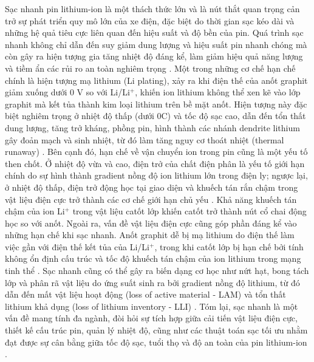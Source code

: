 \documentclass{thesis}
\begin{document}
Sạc nhanh pin lithium-ion là một thách thức lớn và là nút thắt quan trọng cản trở sự phát triển quy mô lớn của xe điện, đặc biệt do thời gian sạc kéo dài và những hệ quả tiêu cực liên quan đến hiệu suất và độ bền của pin. Quá trình sạc nhanh không chỉ dẫn đến suy giảm dung lượng và hiệu suất pin nhanh chóng mà còn gây ra hiện tượng gia tăng nhiệt độ đáng kể, làm giảm hiệu quả năng lượng và tiềm ẩn các rủi ro an toàn nghiêm trọng \cite{Xie2020, Zhang2020, Li2020}. Một trong những cơ chế hạn chế chính là hiện tượng mạ lithium (Li plating), xảy ra khi điện thế của anốt graphit giảm xuống dưới 0 V so với Li/Li$^+$, khiến ion lithium không thể xen kẽ vào lớp graphit mà kết tủa thành kim loại lithium trên bề mặt anốt. Hiện tượng này đặc biệt nghiêm trọng ở nhiệt độ thấp (dưới 0\textdegree C) và tốc độ sạc cao, dẫn đến tổn thất dung lượng, tăng trở kháng, phồng pin, hình thành các nhánh dendrite lithium gây đoản mạch và sinh nhiệt, từ đó làm tăng nguy cơ thoát nhiệt (thermal runaway) \cite{Zhang2020, Tomaszewska2019}. Bên cạnh đó, hạn chế về vận chuyển ion trong pin cũng là một yếu tố then chốt. Ở nhiệt độ vừa và cao, điện trở của chất điện phân là yếu tố giới hạn chính do sự hình thành gradient nồng độ ion lithium lớn trong điện ly; ngược lại, ở nhiệt độ thấp, điện trở động học tại giao diện và khuếch tán rắn chậm trong vật liệu điện cực trở thành các cơ chế giới hạn chủ yếu \cite{Hasan2015, Tomaszewska2019}. Khả năng khuếch tán chậm của ion Li$^+$ trong vật liệu catốt lớp khiến catốt trở thành nút cổ chai động học so với anốt. Ngoài ra, vấn đề vật liệu điện cực cũng góp phần đáng kể vào những hạn chế khi sạc nhanh. Anốt graphit dễ bị mạ lithium do điện thế làm việc gần với điện thế kết tủa của Li/Li$^+$, trong khi catốt lớp bị hạn chế bởi tính không ổn định cấu trúc và tốc độ khuếch tán chậm của ion lithium trong mạng tinh thể \cite{Xie2020, Li2020}. Sạc nhanh cũng có thể gây ra biến dạng cơ học như nứt hạt, bong tách lớp và phân rã vật liệu do ứng suất sinh ra bởi gradient nồng độ lithium, từ đó dẫn đến mất vật liệu hoạt động (loss of active material - LAM) và tổn thất lithium khả dụng (loss of lithium inventory - LLI) \cite{Tomaszewska2019, Zhang2016}. Tóm lại, sạc nhanh là một vấn đề mang tính đa ngành, đòi hỏi sự tích hợp giữa cải tiến vật liệu điện cực, thiết kế cấu trúc pin, quản lý nhiệt độ, cũng như các thuật toán sạc tối ưu nhằm đạt được sự cân bằng giữa tốc độ sạc, tuổi thọ và độ an toàn của pin lithium-ion \cite{Xie2020, Hasan2015, Zhang2016, Li2020}.
\end{document}
